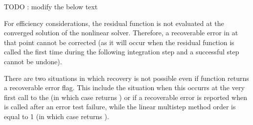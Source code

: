 {

\bigskip TODO : modify the below text

  {\warn}For efficiency considerations, the residual function is not
  evaluated at the converged solution of the nonlinear solver. Therefore, a
  recoverable error in  at that point cannot be corrected (as it will 
  occur when the residual function is called the first time during the 
  following integration step and a successful step cannot be undone).

  There are two situations in which recovery is not possible even if 
  function returns a recoverable error flag. This include the situation when this
  occurrs at the very first call to the  (in which case {\idas} returns
  ) or if a recoverable error is reported when 
  is called after an error test failure, while the linear multistep method order is
  equal to 1 (in which case {\idas} returns ).
}

  
